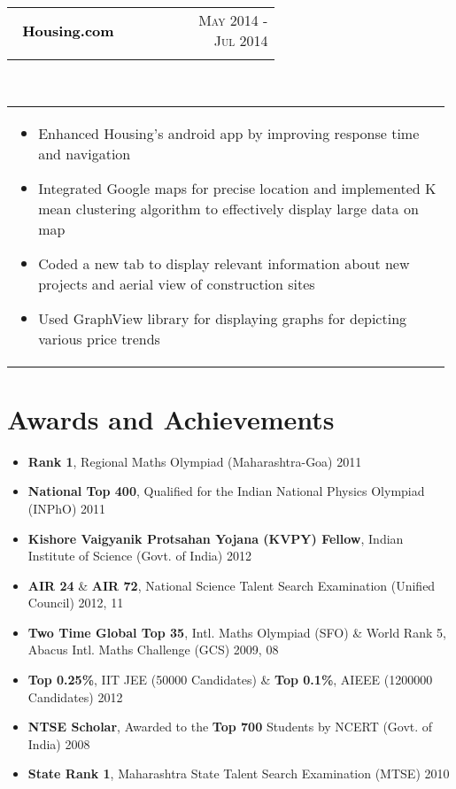 \documentclass[a4paper]{article} %
\newcommand{\verticalspacing}{-0.55cm}
\newcommand{\bulletspace}{0.7cm}
\newcommand{\projectheadspacing}{6.9cm}
\newcommand{\cproject}[5]{%
    \begin{tabular}{p{0.60\linewidth} r}
        \textcolor{Black}{\textbf{\large\ #2  }} & \multicolumn{1}{m{ \projectheadspacing{} }}{\raggedleft \small {\textsc{#1}}}\\
        \small {#3} & \small {#4}
    \end{tabular}\\
    \begin{tabular}{p{0.98\linewidth}}
    \vspace{-0.1cm}
        \small{#5}
    \end{tabular}
    \vspace{\verticalspacing{}}
}
\begin{document}
\cproject
      {May 2014 - Jul 2014}
      {Housing.com}
      {}
      {}
      {%
        \vspace{-0.7cm}
        \begin{itemize}[itemsep = -0.8mm,leftmargin=\bulletspace{}]
         \item Enhanced Housing’s android app by improving response time and navigation 
         \item Integrated Google maps for precise location and implemented K mean clustering algorithm to effectively display large data on map
         \item Coded a new tab to display relevant information about new projects and aerial view of  construction sites
         \item Used GraphView library for displaying graphs for depicting various price trends
        \end{itemize}
      }


\vspace{-0.4cm}
\section{Awards and Achievements}

 \begin{itemize}[itemsep = -0.8mm,leftmargin=\bulletspace{}]
            \item \noindent \textbf{Rank 1}, Regional Maths Olympiad (Maharashtra-Goa) \hfill 2011
            \item  \noindent \textbf{National Top 400}, Qualified for the Indian National Physics Olympiad (INPhO) \hfill 2011
            \item \noindent \textbf{Kishore Vaigyanik Protsahan Yojana (KVPY) Fellow}, Indian Institute of Science (Govt. of India) \hfill 2012
            \item \noindent \textbf{AIR 24} \& \textbf{AIR 72}, National Science Talent Search Examination (Unified Council) \hfill 2012, 11
            \item \noindent \textbf{Two Time Global Top 35}, Intl. Maths Olympiad (SFO) \& World Rank 5, Abacus Intl. Maths Challenge (GCS) \hfill 2009, 08
            \item \noindent \textbf{Top 0.25\%}, IIT JEE (50000 Candidates) \& \textbf{Top 0.1\%}, AIEEE (1200000 Candidates) \hfill 2012
            \item \noindent \textbf{NTSE Scholar}, Awarded to the \textbf{Top 700} Students by NCERT (Govt. of India) \hfill 2008
            \item \noindent \textbf{State Rank 1}, Maharashtra State Talent Search Examination (MTSE) \hfill 2010
         \end{itemize}
\end{document}
